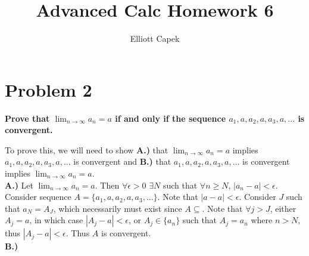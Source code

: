 \documentclass[10pt]{article} %
\title{Advanced Calc Homework 6}
\author{Elliott Capek}
\begin{document}
\maketitle{}

\section{Problem 2}
\textbf{Prove that $\lim_{n\rightarrow\infty}a_n = a$ if and only if the sequence $a_1, a, a_2, a, a_3, a,...$ is convergent.}

To prove this, we will need to show \textbf{A.)} that $\lim_{n\rightarrow\infty}a_n = a$ implies $a_1, a, a_2, a, a_3, a,...$ is convergent and \textbf{B.)} that $a_1, a, a_2, a, a_3, a,...$ is convergent implies $\lim_{n\rightarrow\infty}a_n = a$.\\

\textbf{A.)}
Let $\lim_{n\rightarrow\infty}a_n = a$. Then $\forall \epsilon>0$ $\exists N$ such that $\forall n \geq N$, $|a_n-a|<\epsilon$. Consider sequence $A = \{a_1, a, a_2, a, a_3, ...\}$. Note that $|a-a|<\epsilon$. Consider $J$ such that $a_N = A_J$, which necessarily must exist since $A \subseteq$. Note that $\forall j>J$, either $A_j = a$, in which case $|A_j-a|<\epsilon$, or $A_j \in \{a_n\}$ such that $A_j = a_n$ where $n > N$, thus $|A_j-a|<\epsilon$. Thus $A$ is convergent.\\

\textbf{B.)}
\end{document}
